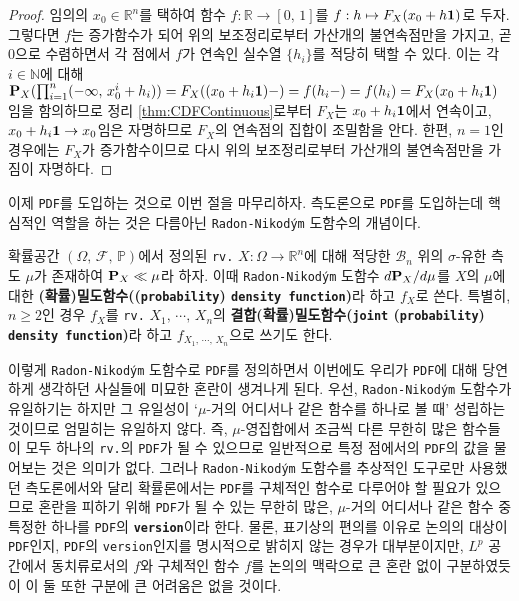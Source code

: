\begin{proof}
    임의의 $x_0\in\mathbb{R}^n$를 택하여 함수 $f:\mathbb{R}\to[0,\,1]$를 $f:h\mapsto F_X(x_0+h\mathbf{1})$로 두자. 그렇다면 $f$는 증가함수가 되어 위의 보조정리로부터 가산개의 불연속점만을 가지고, 곧 $0$으로 수렴하면서 각 점에서 $f$가 연속인 실수열 $\{h_i\}$를 적당히 택할 수 있다. 이는 각 $i\in\mathbb{N}$에 대해 $\mathbf{P}_X(\prod_{i=1}^n(-\infty,\,x_0^i+h_i))=F_X((x_0+h_i\mathbf{1})-)=f(h_i-)=f(h_i)=F_X(x_0+h_i\mathbf{1})$임을 함의하므로 정리 \ref{thm:CDFContinuous}로부터 $F_X$는 $x_0+h_i\mathbf{1}$에서 연속이고, $x_0+h_i\mathbf{1}\to x_0$임은 자명하므로 $F_X$의 연속점의 집합이 조밀함을 안다. 한편, $n=1$인 경우에는 $F_X$가 증가함수이므로 다시 위의 보조정리로부터 가산개의 불연속점만을 가짐이 자명하다.
\end{proof}

이제 \texttt{PDF}를 도입하는 것으로 이번 절을 마무리하자. 측도론으로 \texttt{PDF}를 도입하는데 핵심적인 역할을 하는 것은 다름아닌 \texttt{Radon-Nikod\'ym} 도함수의 개념이다.

\begin{definition}
    확률공간 $(\Omega,\,\mathcal{F},\,\mathbb{P})$에서 정의된 \texttt{rv.} $X:\Omega\to\mathbb{R}^n$에 대해 적당한 $\mathcal{B}_n$ 위의 $\sigma$-유한 측도 $\mu$가 존재하여 $\mathbf{P}_X\ll\mu$라 하자. 이때 \texttt{Radon-Nikod\'ym} 도함수 $d\mathbf{P}_X/d\mu$를 $X$의 $\mu$에 대한 \textbf{(확률)밀도함수((\texttt{probability}) \texttt{density function})}라 하고 $f_X$로 쓴다. 특별히, $n\geq2$인 경우 $f_X$를 \texttt{rv.} $X_1,\,\cdots,\,X_n$의 \textbf{결합(확률)밀도함수(\texttt{joint} (\texttt{probability}) \texttt{density function})}라 하고 $f_{X_1,\,\cdots,\,X_n}$으로 쓰기도 한다.
\end{definition}

이렇게 \texttt{Radon-Nikod\'ym} 도함수로 \texttt{PDF}를 정의하면서 이번에도 우리가 \texttt{PDF}에 대해 당연하게 생각하던 사실들에 미묘한 혼란이 생겨나게 된다. 우선, \texttt{Radon-Nikod\'ym} 도함수가 유일하기는 하지만 그 유일성이 `$\mu$-거의 어디서나 같은 함수를 하나로 볼 때' 성립하는 것이므로 엄밀히는 유일하지 않다. 즉, $\mu$-영집합에서 조금씩 다른 무한히 많은 함수들이 모두 하나의 \texttt{rv.}의 \texttt{PDF}가 될 수 있으므로 일반적으로 특정 점에서의 \texttt{PDF}의 값을 물어보는 것은 의미가 없다. 그러나 \texttt{Radon-Nikod\'ym} 도함수를 추상적인 도구로만 사용했던 측도론에서와 달리 확률론에서는 \texttt{PDF}를 구체적인 함수로 다루어야 할 필요가 있으므로 혼란을 피하기 위해 \texttt{PDF}가 될 수 있는 무한히 많은, $\mu$-거의 어디서나 같은 함수 중 특정한 하나를 \texttt{PDF}의 \textbf{\texttt{version}}이라 한다. 물론, 표기상의 편의를 이유로 논의의 대상이 \texttt{PDF}인지, \texttt{PDF}의 \texttt{version}인지를 명시적으로 밝히지 않는 경우가 대부분이지만, $L^p$ 공간에서 동치류로서의 $f$와 구체적인 함수 $f$를 논의의 맥락으로 큰 혼란 없이 구분하였듯이 이 둘 또한 구분에 큰 어려움은 없을 것이다.

